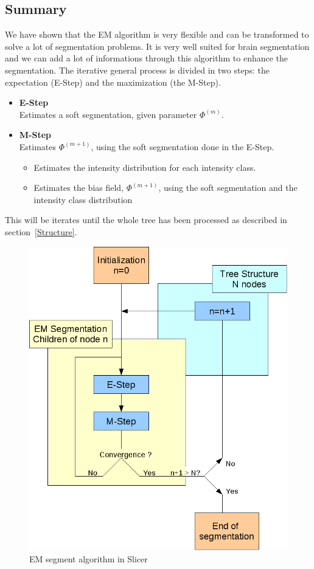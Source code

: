 \subsection{Summary}\label{SUMMARY}
We have shown that the EM algorithm is very flexible and can be transformed to solve a lot of segmentation problems. It is very well suited for brain segmentation  and we can add a lot of informations through this algorithm to enhance the segmentation. The iterative general process is divided in two steps: the expectation (E-Step) and the maximization (the M-Step).

  \begin{itemize}
  \item \textbf{E-Step}\\  
  Estimates a soft segmentation, given parameter $\Phi^{(m)}$.
  
  \item \textbf{M-Step}\\
  Estimates $\Phi^{(m+1)}$, using the soft segmentation done in the E-Step.
  
    \begin{itemize}
    \item Estimates the intensity distribution for each intensity class.    
    \item Estimates the bias field, $\Phi^{(m+1)}$, using the soft segmentation and the intensity class distribution
    \end{itemize}
  \end{itemize}
  
This will be iterates until the whole tree has been processed as described in section~\ref{Structure}.

  \begin{figure}[ht]\centering
  \includegraphics[width=.8\textwidth]{Images/Graphics/workflowtheorical.png}
  \caption{EM segment algorithm in Slicer}\label{fig:EMSSlicer}
  \end{figure}
  
